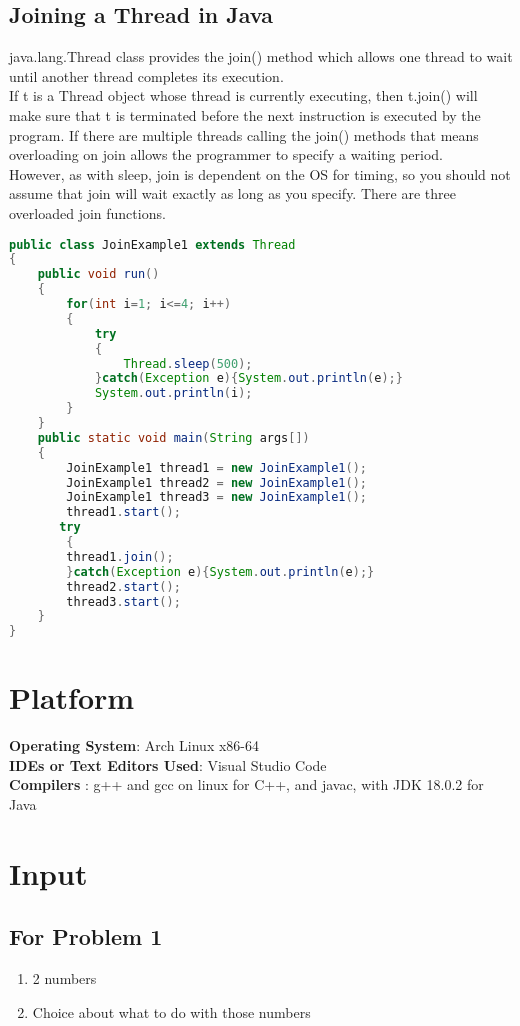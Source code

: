 \documentclass[11pt]{article}
\begin{document}
\subsection{Joining a Thread in Java}
java.lang.Thread class provides the join() method which allows one thread to wait until another thread completes its execution.\\

If t is a Thread object whose thread is currently executing, then t.join() will make sure that t is terminated before the next instruction is executed by the program.
If there are multiple threads calling the join() methods that means overloading on join allows the programmer to specify a waiting period.\\

However, as with sleep, join is dependent on the OS for timing, so you should not assume that join will wait exactly as long as you specify.
There are three overloaded join functions.
\begin{lstlisting}[language=Java]
public class JoinExample1 extends Thread  
{    
    public void run()  
    {    
        for(int i=1; i<=4; i++)  
        {    
            try 
            {    
                Thread.sleep(500);    
            }catch(Exception e){System.out.println(e);}    
            System.out.println(i);    
        }    
    }    
    public static void main(String args[])  
    {   
        JoinExample1 thread1 = new JoinExample1();    
        JoinExample1 thread2 = new JoinExample1();    
        JoinExample1 thread3 = new JoinExample1();    
        thread1.start();   
       try 
        {    
        thread1.join();    
        }catch(Exception e){System.out.println(e);}    
        thread2.start();   
        thread3.start();    
    }    
}
\end{lstlisting}
\section{Platform}
\textbf{Operating System}: Arch Linux x86-64 \\
\textbf{IDEs or Text Editors Used}: Visual Studio Code\\
\textbf{Compilers} : g++ and gcc on linux for C++, and javac, with JDK 18.0.2 for Java\\

\section{Input}
\subsection*{For Problem 1}
\begin{enumerate}
	\item 2 numbers
	\item Choice about what to do with those numbers 
\end{enumerate}
\end{document}
